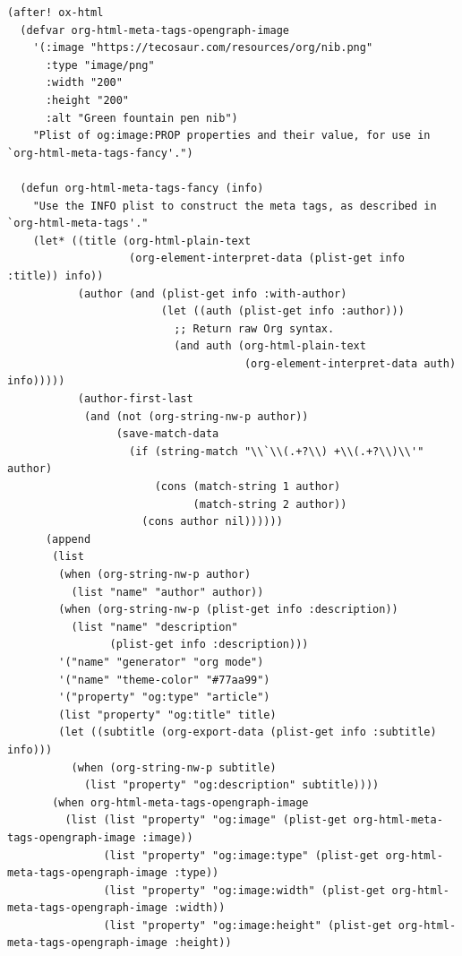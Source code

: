 \documentclass[11pt]{article}
\begin{document}
\begin{verbatim}
(after! ox-html
  (defvar org-html-meta-tags-opengraph-image
    '(:image "https://tecosaur.com/resources/org/nib.png"
      :type "image/png"
      :width "200"
      :height "200"
      :alt "Green fountain pen nib")
    "Plist of og:image:PROP properties and their value, for use in `org-html-meta-tags-fancy'.")

  (defun org-html-meta-tags-fancy (info)
    "Use the INFO plist to construct the meta tags, as described in `org-html-meta-tags'."
    (let* ((title (org-html-plain-text
                   (org-element-interpret-data (plist-get info :title)) info))
           (author (and (plist-get info :with-author)
                        (let ((auth (plist-get info :author)))
                          ;; Return raw Org syntax.
                          (and auth (org-html-plain-text
                                     (org-element-interpret-data auth) info)))))
           (author-first-last
            (and (not (org-string-nw-p author))
                 (save-match-data
                   (if (string-match "\\`\\(.+?\\) +\\(.+?\\)\\'" author)
                       (cons (match-string 1 author)
                             (match-string 2 author))
                     (cons author nil))))))
      (append
       (list
        (when (org-string-nw-p author)
          (list "name" "author" author))
        (when (org-string-nw-p (plist-get info :description))
          (list "name" "description"
                (plist-get info :description)))
        '("name" "generator" "org mode")
        '("name" "theme-color" "#77aa99")
        '("property" "og:type" "article")
        (list "property" "og:title" title)
        (let ((subtitle (org-export-data (plist-get info :subtitle) info)))
          (when (org-string-nw-p subtitle)
            (list "property" "og:description" subtitle))))
       (when org-html-meta-tags-opengraph-image
         (list (list "property" "og:image" (plist-get org-html-meta-tags-opengraph-image :image))
               (list "property" "og:image:type" (plist-get org-html-meta-tags-opengraph-image :type))
               (list "property" "og:image:width" (plist-get org-html-meta-tags-opengraph-image :width))
               (list "property" "og:image:height" (plist-get org-html-meta-tags-opengraph-image :height))

\end{verbatim}
\end{document}

